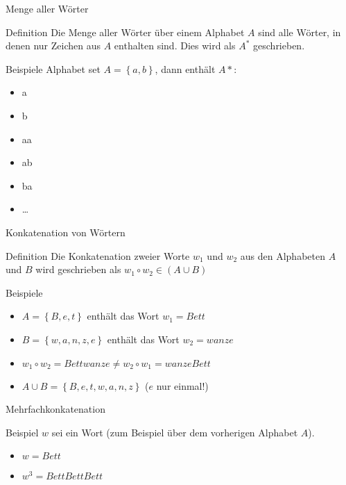 \documentclass[18pt]{beamer}
\begin{document}
\begin{frame}{Menge aller Wörter}
    \begin{block}{Definition}
        Die Menge aller Wörter über einem Alphabet $A$ sind alle Wörter, in denen nur Zeichen aus $A$ enthalten sind. Dies wird als $A^*$ geschrieben.
        \end{block}
    \begin{exampleblock}{Beispiele}
        Alphabet set $A = \left\{a, b \right\}$, dann enthält $A*$:
        \begin{itemize}
            \item a
            \item b
            \item aa
            \item ab
            \item ba
            \item \dots
        \end{itemize}
    \end{exampleblock}
\end{frame}

\begin{frame}{Konkatenation von Wörtern}
    \begin{block}{Definition}
        Die Konkatenation zweier Worte $w_1$ und $w_2$ aus den Alphabeten $A$ und $B$ wird geschrieben als $w_1 \circ w_2 \in \left( A \cup B\right)$    
    \end{block}
    \begin{exampleblock}{Beispiele}
        \begin{itemize}
            \item $A = \left\{B, e, t\right\}$  enthält das Wort $w_1 = Bett$\\
            \item $B = \left\{w, a, n, z, e\right\}$ enthält das Wort $w_2 = wanze$\\
                \pause
            \item $w_1 \circ w_2 = Bettwanze \neq w_2 \circ w_1 = wanzeBett$
                \pause
            \item $A \cup B = \left\{B, e, t, w, a, n, z\right\}$ ($e$ nur einmal!)
        \end{itemize}
    \end{exampleblock}
\end{frame}

\begin{frame}{Mehrfachkonkatenation}
    \begin{exampleblock}{Beispiel}
        $w$ sei ein Wort (zum Beispiel über dem vorherigen Alphabet $A$).
        \begin{itemize}
            \item $w = Bett$
            \item $w^3 = BettBettBett$
        \end{itemize}
    \end{exampleblock}
\end{frame}
\end{document}

